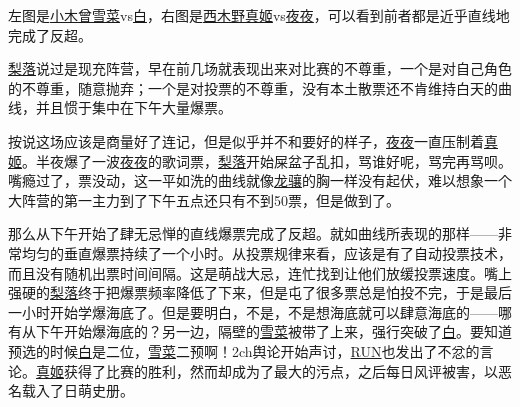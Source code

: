
左图是\uline{小木曾雪菜}vs\uline{白}，右图是\uline{西木野真姬}vs\uline{夜夜}，可以看到前者都是近乎直线地完成了反超。

\uline{梨落}说过是现充阵营，早在前几场就表现出来对比赛的不尊重，一个是对自己角色的不尊重，随意抛弃；一个是对投票的不尊重，没有本土散票还不肯维持白天的曲线，并且惯于集中在下午大量爆票。

按说这场应该是商量好了连记，但是似乎并不和要好的样子，\uline{夜夜}一直压制着\uline{真姬}。半夜爆了一波\uline{夜夜}的歌词票，\uline{梨落}开始屎盆子乱扣，骂谁好呢，骂完再骂呗。嘴瘾过了，票没动，这一平如洗的曲线就像\uline{龙骧}的胸一样没有起伏，难以想象一个大阵营的第一主力到了下午五点还只有不到50票，但是做到了。

那么从下午开始了肆无忌惮的直线爆票完成了反超。就如曲线所表现的那样——非常均匀的垂直爆票持续了一个小时。从投票规律来看，应该是有了自动投票技术，而且没有随机出票时间间隔。这是萌战大忌，连忙找到让他们放缓投票速度。嘴上强硬的\uline{梨落}终于把爆票频率降低了下来，但是屯了很多票总是怕投不完，于是最后一小时开始学爆海底了。但是要明白，不是，不是想海底就可以肆意海底的——哪有从下午开始爆海底的？另一边，隔壁的\uline{雪菜}被带了上来，强行突破了\uline{白}。要知道预选的时候\uline{白}是二位，\uline{雪菜}二预啊！2ch舆论开始声讨，\uline{RUN}也发出了不忿的言论。\uline{真姬}获得了比赛的胜利，然而却成为了最大的污点，之后每日风评被害，以恶名载入了日萌史册。

